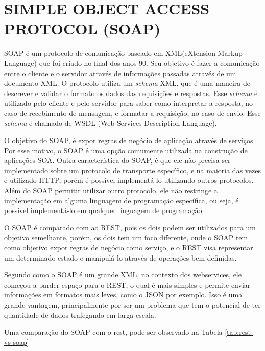 

\section{SIMPLE OBJECT ACCESS PROTOCOL (SOAP)}
SOAP é um protocolo de comunicação baseado em XML(eXtension Markup Language) que foi criado no final 
dos anos 90. Seu objetivo é fazer a comunicação entre o cliente e o servidor através de informações 
passadas através de um documento XML. O protocolo utiliza um \textit{schema} XML, que é uma 
maneira de descrever e validar o formato os dados das requisições e respostas. 
Esse \textit{schema} é utilizado pelo cliente e pelo servidor para saber como interpretar 
a resposta, no caso de recebimento de mensagem, e formatar a requisição, no caso de envio.
Esse \textit{schema} é chamado de WSDL (Web Services Description Language).

O objetivo do SOAP, é expor regras de negócio de aplicação através de serviços. 
Por esse motivo, o SOAP é uma opção comumente utilizada na construção de aplicações SOA. 
Outra característica do SOAP, é que ele não precisa ser implementado sobre um protocolo de 
transporte específico, e na maioria das vezes é utilizado HTTP, porém é possível implementá-lo
utilizando outros protocolos. Além do SOAP permitir utilizar outro protocolo, 
ele não restringe a implementação em alguma linguagem de programação específica, ou seja,
é possível implementá-lo em qualquer linguagem de programação.

O SOAP é comparado com ao REST, pois os dois podem ser utilizados para um objetivo 
semelhante, porém, os dois tem um foco diferente, onde o SOAP tem como objetivo expor regras de negócio 
como serviço, e o REST visa representar um determinado estado e manipulá-lo através de operações 
bem definidas.

Segundo \cite{lecheta} como o SOAP é um grande XML, no contexto dos webservices, ele começou
a parder espaço para o REST, o qual é mais simples 
e permite enviar informações em formatos mais leves, como o JSON por exemplo. 
Isso é uma grande vantagem, principalmente por ser um problema
que tem o potencial de ter quantidade de dados trafegando em larga escala.

Uma comparação do SOAP com o rest, pode ser observado na Tabela \ref{tab:rest-vs-soap}



